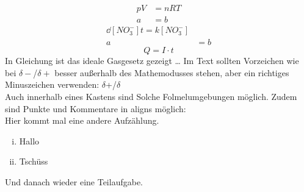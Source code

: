 \documentclass[./main.tex]{subfiles}
\begin{document}
\begin{align}
    pV &= nRT \label{G:test-Gl}\\
    a &= b
\end{align}
\begin{align*}
    \dd{[NO_3^-]}{t}  = k [NO_3^-]\\
    a &= b
\end{align*}
\begin{equation*}
    Q = I \cdot t
\end{equation*}
In Gleichung ist das ideale Gasgesetz gezeigt \ldots 
Im Text sollten Vorzeichen wie bei $\delta-$/$\delta+$ besser au\ss{}erhalb des Mathemodusses stehen, aber ein richtiges Minuszeichen verwenden: $\delta$+/$\delta$\textminus{}\\
Auch innerhalb eines Kastens sind Solche Folmelumgebungen möglich. Zudem sind Punkte und Kommentare in aligns möglich:\\
Hier kommt mal eine andere Aufz\"ahlung.\\
\begin{enumerate}[(i)]
    \item Hallo
    \item Tsch\"uss
\end{enumerate}

Und danach wieder eine Teilaufgabe.

\aufgabenende
\end{document}
